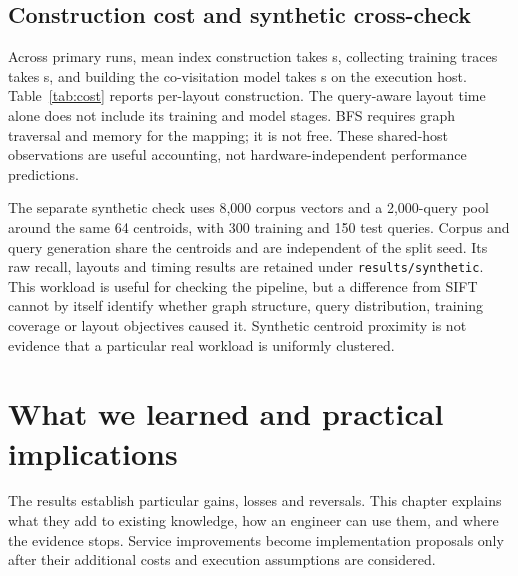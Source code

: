 \documentclass[11pt,a4paper]{report}
\newcommand{\QA}{query-aware}
\begin{document}
\section{Construction cost and synthetic cross-check}
Across primary runs, mean index construction takes \MeanIndexSeconds{} s, collecting training traces takes \MeanTrainingSeconds{} s, and building the co-visitation model takes \MeanModelSeconds{} s on the execution host. Table~\ref{tab:cost} reports per-layout construction. The \QA{} layout time alone does not include its training and model stages. BFS requires graph traversal and memory for the mapping; it is not free. These shared-host observations are useful accounting, not hardware-independent performance predictions.
\begin{table}[htbp]\centering\caption[Layout construction cost]{Observed layout construction times for the primary float32 footprint. Shared-host wall-clock measurements; no performance-isolation claim.}\label{tab:cost}
\end{table}

The separate synthetic check uses 8,000 corpus vectors and a 2,000-query pool around the same 64 centroids, with 300 training and 150 test queries. Corpus and query generation share the centroids and are independent of the split seed. Its raw recall, layouts and timing results are retained under \texttt{results/synthetic}. This workload is useful for checking the pipeline, but a difference from SIFT cannot by itself identify whether graph structure, query distribution, training coverage or layout objectives caused it. Synthetic centroid proximity is not evidence that a particular real workload is uniformly clustered.

\chapter{What we learned and practical implications}
\label{ch:lessons}
The results establish particular gains, losses and reversals. This chapter explains what they add to existing knowledge, how an engineer can use them, and where the evidence stops. Service improvements become implementation proposals only after their additional costs and execution assumptions are considered.
\end{document}
